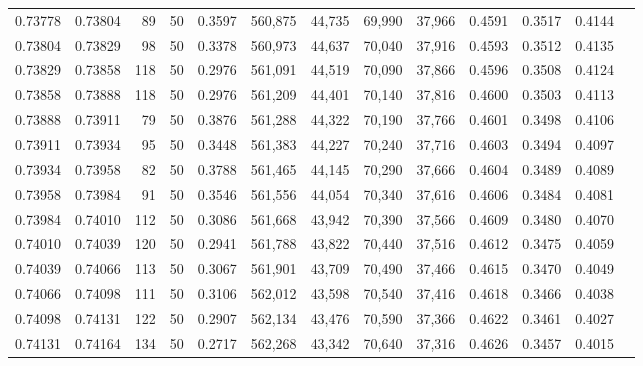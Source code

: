 \begin{tabular}{rrrrrrrrrrrrr}
0.73778 & 0.73804 &    89 &  50 &                                     0.3597 & 560,875 &  44,735 &  69,990 &  37,966 & 0.4591 & 0.3517 & 0.4144 \\
0.73804 & 0.73829 &    98 &  50 &                                     0.3378 & 560,973 &  44,637 &  70,040 &  37,916 & 0.4593 & 0.3512 & 0.4135 \\
0.73829 & 0.73858 &   118 &  50 &                                     0.2976 & 561,091 &  44,519 &  70,090 &  37,866 & 0.4596 & 0.3508 & 0.4124 \\
0.73858 & 0.73888 &   118 &  50 &                                     0.2976 & 561,209 &  44,401 &  70,140 &  37,816 & 0.4600 & 0.3503 & 0.4113 \\
0.73888 & 0.73911 &    79 &  50 &                                     0.3876 & 561,288 &  44,322 &  70,190 &  37,766 & 0.4601 & 0.3498 & 0.4106 \\
0.73911 & 0.73934 &    95 &  50 &                                     0.3448 & 561,383 &  44,227 &  70,240 &  37,716 & 0.4603 & 0.3494 & 0.4097 \\
0.73934 & 0.73958 &    82 &  50 &                                     0.3788 & 561,465 &  44,145 &  70,290 &  37,666 & 0.4604 & 0.3489 & 0.4089 \\
0.73958 & 0.73984 &    91 &  50 &                                     0.3546 & 561,556 &  44,054 &  70,340 &  37,616 & 0.4606 & 0.3484 & 0.4081 \\
0.73984 & 0.74010 &   112 &  50 &                                     0.3086 & 561,668 &  43,942 &  70,390 &  37,566 & 0.4609 & 0.3480 & 0.4070 \\
0.74010 & 0.74039 &   120 &  50 &                                     0.2941 & 561,788 &  43,822 &  70,440 &  37,516 & 0.4612 & 0.3475 & 0.4059 \\
0.74039 & 0.74066 &   113 &  50 &                                     0.3067 & 561,901 &  43,709 &  70,490 &  37,466 & 0.4615 & 0.3470 & 0.4049 \\
0.74066 & 0.74098 &   111 &  50 &                                     0.3106 & 562,012 &  43,598 &  70,540 &  37,416 & 0.4618 & 0.3466 & 0.4038 \\
0.74098 & 0.74131 &   122 &  50 &                                     0.2907 & 562,134 &  43,476 &  70,590 &  37,366 & 0.4622 & 0.3461 & 0.4027 \\
0.74131 & 0.74164 &   134 &  50 &                                     0.2717 & 562,268 &  43,342 &  70,640 &  37,316 & 0.4626 & 0.3457 & 0.4015 \\

\end{tabular}
